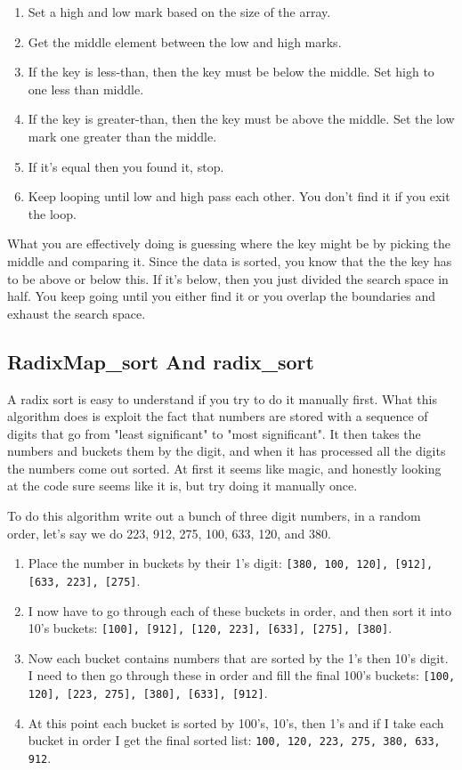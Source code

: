 \begin{enumerate}
\item Set a high and low mark based on the size of the array.
\item Get the middle element between the low and high marks.
\item If the key is less-than, then the key must be below the middle.  Set high to one less than middle.
\item If the key is greater-than, then the key must be above the middle.  Set the low mark one greater than the middle.
\item If it's equal then you found it, stop.
\item Keep looping until low and high pass each other.  You don't find it if you exit the loop.
\end{enumerate}

What you are effectively doing is guessing where the key might be by picking
the middle and comparing it.  Since the data is sorted, you know that the
the key has to be above or below this.  If it's below, then you just divided
the search space in half.  You keep going until you either find it or you
overlap the boundaries and exhaust the search space.

\subsection{RadixMap\_sort And radix\_sort}

A radix sort is easy to understand if you try to do it manually first.  What
this algorithm does is exploit the fact that numbers are stored with a 
sequence of digits that go from "least significant" to "most significant".
It then takes the numbers and buckets them by the digit, and when it has
processed all the digits the numbers come out sorted.  At first it
seems like magic, and honestly looking at the code sure seems like it is,
but try doing it manually once.

To do this algorithm write out a bunch of three digit numbers, in a random
order, let's say we do 223, 912, 275, 100, 633, 120, and 380.

\begin{enumerate}
\item Place the number in buckets by their 1's digit:
    \verb|[380, 100, 120], [912], [633, 223], [275]|.
\item I now have to go through each of these buckets in order, and then sort it into 10's buckets:
    \verb|[100], [912], [120, 223], [633], [275], [380]|.
\item Now each bucket contains numbers that are sorted by the 1's then 10's digit.  I need to then go through these in order and fill the final 100's buckets: 
    \verb|[100, 120], [223, 275], [380], [633], [912]|.
\item At this point each bucket is sorted by 100's, 10's, then 1's and if I
    take each bucket in order I get the final sorted list: 
    \verb|100, 120, 223, 275, 380, 633, 912|.
\end{enumerate}

